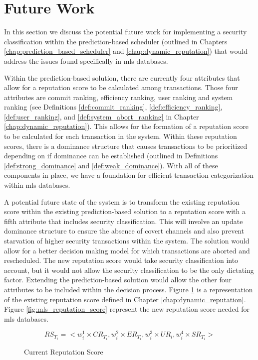 \section{Future Work}
\label{mls:future_work}

In this section we discuss the potential future work for implementing a security classification within the prediction-based scheduler (outlined in Chapters \ref{chap:prediction_based_scheduler} and \ref{chap:dynamic_reputation}) that would address the issues found specifically in \gls{mls} databases. 

Within the prediction-based solution, there are currently four attributes that allow for a reputation score to be calculated among transactions. Those four attributes are commit ranking, efficiency ranking, user ranking and system ranking (see Definitions \ref{def:commit_ranking}, \ref{def:efficiency_ranking}, \ref{def:user_ranking}, and \ref{def:system_abort_ranking} in Chapter \ref{chap:dynamic_reputation}). This allows for the formation of a reputation score to be calculated for each transaction in the system. Within these reputation scores, there is a dominance structure that causes transactions to be prioritized depending on if dominance can be established (outlined in Definitions \ref{def:strong_dominance} and \ref{def:weak_dominance}). With all of these components in place, we have a foundation for efficient transaction categorization within \gls{mls} databases.

A potential future state of the system is to transform the existing reputation score within the existing prediction-based solution to a reputation score with a fifth attribute that includes security classification. This will involve an update dominance structure to ensure the absence of covert channels and also prevent starvation of higher security transactions within the system. The solution would allow for a better decision making model for which transactions are aborted and rescheduled. The new reputation score would take security classification into account, but it would not allow the security classification to be the only dictating factor. Extending the prediction-based solution would allow the other four attributes to be included within the decision process. Figure \ref{fig:existing_reputation_score} is a representation of the existing reputation score defined in Chapter \ref{chap:dynamic_reputation}. Figure \ref{fig:mls_reputation_score} represent the new reputation score needed for \gls{mls} databases.

\begin{figure}[h]
\captionsetup{justification=centering}
\centering %

\[\textrm{$RS_{T_{i}} = <w_{i}^{1}\times CR_{T_{i}},w_{i}^{2}\times ER_{T_{i}},w_{i}^{3}\times UR_{i},w_{i}^{4}\times SR_{T_{i}}>$}\]

\caption{Current Reputation Score} %
\label{fig:existing_reputation_score} %

\end{figure}

